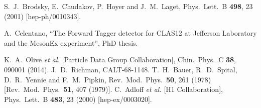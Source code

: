 \documentclass[a4paper,10pt]{article}
\begin{document}
\begin{thebibliography}{9}
  S.~J.~Brodsky, E.~Chudakov, P.~Hoyer and J.~M.~Laget,
  Phys.\ Lett.\ B {\bf 498}, 23 (2001)
  [hep-ph/0010343].

  A.~Celentano, ``The Forward Tagger detector for CLAS12 at Jefferson Laboratory and the MesonEx experiment'', PhD thesis.


  K.~A.~Olive {\it et al.} [Particle Data Group Collaboration],
  Chin.\ Phys.\ C {\bf 38}, 090001 (2014).
  J.~D.~Richman,
  CALT-68-1148.
  T.~H.~Bauer, R.~D.~Spital, D.~R.~Yennie and F.~M.~Pipkin,
  Rev.\ Mod.\ Phys.\  {\bf 50}, 261 (1978)
  [Rev.\ Mod.\ Phys.\  {\bf 51}, 407 (1979)].
  C.~Adloff {\it et al.} [H1 Collaboration],
  Phys.\ Lett.\ B {\bf 483}, 23 (2000)
  [hep-ex/0003020].

\end{thebibliography}
\end{document}
